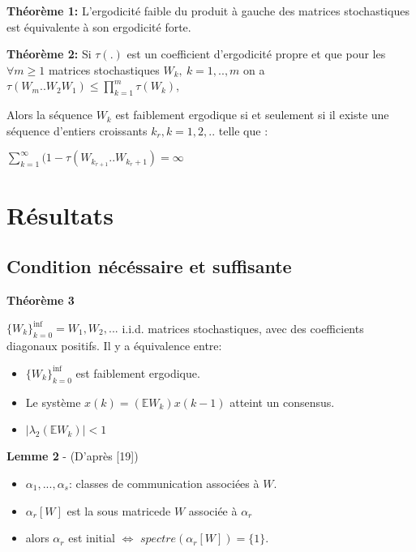 \documentclass{beamer}
\begin{document}
\begin{frame}
	\textbf{Théorème 1:}
		L'ergodicité faible du produit à gauche des matrices stochastiques est équivalente à son ergodicité forte.
	\bigbreak
	
	\pause

	\textbf{Théorème 2:}
		Si $\tau(.)$ est un coefficient d'ergodicité propre et que pour les $\forall m \geq 1$ matrices stochastiques $W_k,\ k=1,..,m$ on a $\tau(W_m .. W_2W_1) \leq \prod_{k=1}^m\tau(W_k)$,
		
	\pause	
	\bigbreak		
		
		Alors la séquence $W_k$ est faiblement ergodique si et seulement si il existe une séquence d'entiers croissants $k_r, k=1,2,..$ telle que :

			\bigbreak
			
			$\sum_{k=1}^{\infty}(1 - \tau(W_{k_{r+1}}..W_{k_r + 1}) = \infty$

\end{frame}

\section{Résultats}

\subsection{Condition nécéssaire et suffisante}
\begin{frame}
	\textbf{Théorème 3}
	\begin{center}
		$\{W_k\}_{k=0}^{\inf} = W_1, W_2, ...$ i.i.d. matrices stochastiques, 
		avec des coefficients diagonaux positifs.
		\pause
		Il y a équivalence entre:
		\begin{itemize}
			\item $\{W_k\}_{k=0}^{\inf}$ est faiblement ergodique.
			\pause
			\item Le système $x(k) = (\mathbb{E}W_k)x(k-1)$ atteint un consensus.
			\item $| \lambda_2(\mathbb{E}W_k)| < 1$
		\end{itemize}
	\end{center}
	\pause
	\textbf{Lemme 2} - (D'après [19])
	\begin{itemize}
		\item $\alpha_1, ..., \alpha_s$: classes de communication associées à $W$.
		\item $\alpha_r[W]$ est la sous matricede $W$ associée à $\alpha_r$
		\item alors $\alpha_r$ est initial $\iff$ $spectre(\alpha_r[W]) = \{1\}$.
	\end{itemize}
\end{frame}
\end{document}
